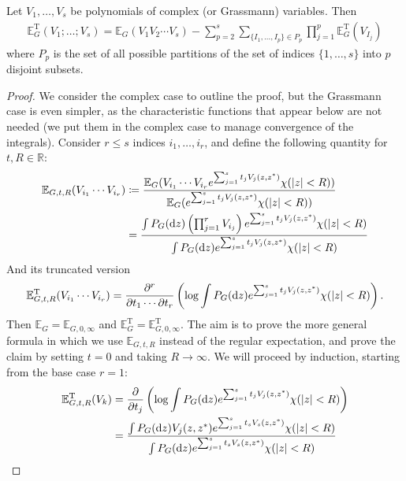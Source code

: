 \begin{theorem}
	\label{thm:linked-cluster}
	Let $V_1,\ldots,V_s$ be polynomials of complex (or Grassmann) variables. Then
	\begin{align*}
		\mathbb{E}_G^{\mathrm{T}}(V_1;\ldots;V_s) = \mathbb{E}_G(V_1V_2\cdots V_s)
		- \sum_{p=2}^s \sum_{\{I_1,\ldots,I_p\}\in P_p} \prod_{j=1}^p \mathbb{E}_G^{\mathrm{T}}(V_{I_j})
	\end{align*}
	where $P_p$ is the set of all possible partitions of the set of indices $\{1,\ldots,s\}$
	into $p$ disjoint subsets.
\end{theorem}
\begin{proof}
	We consider the complex case to outline the proof, but the Grassmann case is even simpler,
	as the characteristic functions that appear below are not needed (we put them in the
	complex case to manage convergence of the integrals). Consider $r\leq s$ indices $i_1,
	\ldots,i_r$, and define the following quantity for $t,R\in\mathbb{R}$:
	\begin{align*}
		\mathbb{E}_{G,t,R}(V_{i_1}\cdots V_{i_r})
		&\coloneq \frac{\mathbb{E}_G(V_{i_1}\cdots V_{i_r}e^{\sum_{j=1}^st_jV_j(z,z^*)}\chi(|z|<R))}
		{\mathbb{E}_G(e^{\sum_{j=1}^st_jV_j(z,z^*)}\chi(|z|<R))}\\
		&= \frac{\int P_G(\mathrm{d} z)\left(\prod_{j=1}^rV_{i_j}\right)e^{\sum_{j=1}^st_jV_j(z,z^*)}\chi(|z|<R)}
		{\int P_G(\mathrm{d} z)e^{\sum_{j=1}^st_jV_j(z,z^*)}\chi(|z|<R)}
	\end{align*}
	And its truncated version
	\begin{align*}
		\mathbb{E}_{G,t,R}^{\mathrm{T}}(V_{i_1}\cdots V_{i_r})
		= \frac{\partial^r}{\partial t_1\cdots\partial t_r}\left(
			\log\int P_G(\mathrm{d} z) e^{\sum_{j=1}^s t_j V_j(z,z^*)}\chi(|z|<R)
		\right).
	\end{align*}
	Then $\mathbb{E}_G = \mathbb{E}_{G,0,\infty}$ and $\mathbb{E}_G^{\mathrm{T}}=
	\mathbb{E}_{G,0,\infty}^{\mathrm{T}}$. The aim is to prove the more general formula in
	which we use $\mathbb{E}_{G,t,R}$ instead of the regular expectation, and prove the claim
	by setting $t=0$ and taking $R\to\infty$. We will proceed by induction, starting
	from the base case $r=1$:
	\begin{align*}
		\mathbb{E}_{G,t,R}^{\mathrm{T}}(V_k)
		&= \frac{\partial}{\partial t_j}
		\left(\log\int P_G(\dx z)e^{\sum_{j=1}^s t_j V_j(z,z^*)}\chi(|z|<R)\right)\\
		&= \frac{\int P_G(\dx z)V_j(z,z^*)e^{\sum_{j=1}^s t_s V_s(z,z^*)}\chi(|z|<R)}
		{\int P_G(\dx z)e^{\sum_{j=1}^s t_s V_s(z,z^*)}\chi(|z|<R)}\\

\end{align*}
\end{proof}
